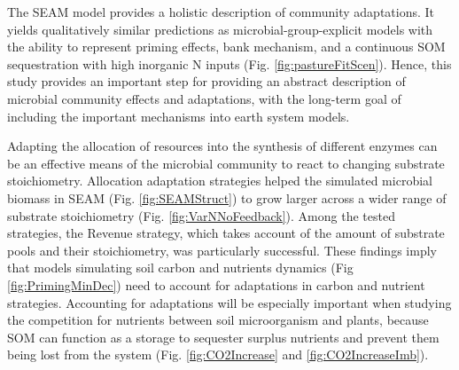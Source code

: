 \conclusions   
 
The SEAM model provides a holistic description of community adaptations. It
yields qualitatively similar predictions as microbial-group-explicit models
with the ability to represent priming effects, bank mechanism, and
a continuous SOM sequestration with high inorganic N inputs (Fig.
\ref{fig:pastureFitScen}). Hence, this study provides an important step for providing an abstract
description of microbial community effects and adaptations, with the long-term
goal of including the important mechanisms into earth system models.

Adapting the allocation of resources into the synthesis of different
enzymes can be an effective means of the microbial community to react to
changing substrate stoichiometry. Allocation adaptation strategies helped the simulated microbial biomass in SEAM
(Fig. \ref{fig:SEAMStruct}) to grow larger across a wider
range of substrate stoichiometry (Fig. \ref{fig:VarNNoFeedback}). Among the
tested strategies, the Revenue strategy, which takes account of the amount of substrate pools and their stoichiometry, was particularly successful.
These findings imply that models simulating soil carbon and nutrients
dynamics (Fig \ref{fig:PrimingMinDec}) need to account for
adaptations in carbon and nutrient strategies. Accounting for adaptations will
be especially important when studying the competition for nutrients between
soil microorganism and plants, because SOM can function as a storage to
sequester surplus nutrients and prevent them being lost from the system (Fig.
\ref{fig:CO2Increase} and \ref{fig:CO2IncreaseImb}).




